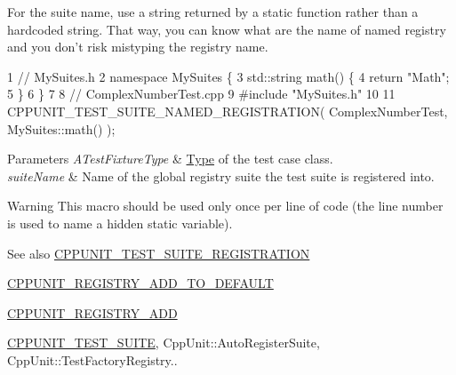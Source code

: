 For the suite name, use a string returned by a static function rather than a hardcoded string. That way, you can know what are the name of named registry and you don't risk mistyping the registry name.


\begin{DoxyCode}
1 // MySuites.h
2 namespace MySuites \{
3   std::string math() \{ 
4     return "Math";
5   \}
6 \}
7 
8 // ComplexNumberTest.cpp
9 #include "MySuites.h"
10 
11 CPPUNIT\_TEST\_SUITE\_NAMED\_REGISTRATION( ComplexNumberTest, MySuites::math() );
\end{DoxyCode}



\begin{DoxyParams}{Parameters}
{\em A\+Test\+Fixture\+Type} & \hyperlink{struct_type}{Type} of the test case class. \\
\hline
{\em suite\+Name} & Name of the global registry suite the test suite is registered into. \\
\hline
\end{DoxyParams}
\begin{DoxyWarning}{Warning}
This macro should be used only once per line of code (the line number is used to name a hidden static variable). 
\end{DoxyWarning}
\begin{DoxySeeAlso}{See also}
\hyperlink{group___creating_test_suite_ga2f4071eec88d1e306665ada0f2dd80e4}{C\+P\+P\+U\+N\+I\+T\+\_\+\+T\+E\+S\+T\+\_\+\+S\+U\+I\+T\+E\+\_\+\+R\+E\+G\+I\+S\+T\+R\+A\+T\+I\+O\+N} 

\hyperlink{group___creating_test_suite_ga9c3be3389213e1dc823ed580cc60878f}{C\+P\+P\+U\+N\+I\+T\+\_\+\+R\+E\+G\+I\+S\+T\+R\+Y\+\_\+\+A\+D\+D\+\_\+\+T\+O\+\_\+\+D\+E\+F\+A\+U\+L\+T} 

\hyperlink{group___creating_test_suite_ga0785e2e8a821f70c69a8127c35c0a667}{C\+P\+P\+U\+N\+I\+T\+\_\+\+R\+E\+G\+I\+S\+T\+R\+Y\+\_\+\+A\+D\+D} 

\hyperlink{group___writing_test_fixture_gabe1e12200f40d6f25d60c1783c99da81}{C\+P\+P\+U\+N\+I\+T\+\_\+\+T\+E\+S\+T\+\_\+\+S\+U\+I\+T\+E}, Cpp\+Unit\+::\+Auto\+Register\+Suite, Cpp\+Unit\+::\+Test\+Factory\+Registry.. 
\end{DoxySeeAlso}
